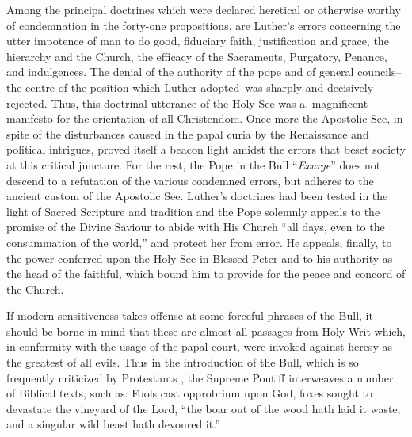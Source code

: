 Among the principal doctrines which were declared heretical or
otherwise worthy of condemnation in the forty-one propositions, are
Luther’s errors concerning the utter impotence of man to do good,
fiduciary faith, justification and grace, the hierarchy and the Church,
the efficacy of the Sacraments, Purgatory, Penance, and indulgences.
The denial of the authority of the pope and of general councils--
the centre of the position which Luther adopted--was sharply and
decisively rejected. Thus, this doctrinal utterance of the Holy See
was a. magnificent manifesto for the orientation of all Christendom.
Once more the Apostolic See, in spite of the disturbances caused in
the papal curia by the Renaissance and political intrigues, proved
itself a beacon light amidst the errors that beset society at this critical
juncture. For the rest, the Pope in the Bull “\textit{Exurge}” does not descend
to a refutation of the various condemned errors, but adheres to the ancient
custom of the Apostolic See. Luther’s doctrines had been tested
in the light of Sacred Scripture and tradition and the Pope solemnly
appeals to the promise of the Divine Saviour to abide with His Church
“all days, even to the consummation of the world,” and protect her
from error. He appeals, finally, to the power conferred upon the Holy
See in Blessed Peter and to his authority as the head of the faithful,
which bound him to provide for the peace and concord of the
Church.

If modern sensitiveness takes offense at some forceful phrases of the
Bull, it should be borne in mind that these are almost all passages from
Holy Writ which, in conformity with the usage of the papal court,
were invoked against heresy as the greatest of all evils. Thus in the
introduction of the Bull, which is so frequently criticized by Protestants
, the Supreme Pontiff interweaves a number of Biblical texts,
such as: Fools cast opprobrium upon God, foxes sought to devastate
the vineyard of the Lord, “the boar out of the wood hath laid it
waste, and a singular wild beast hath devoured it.”

